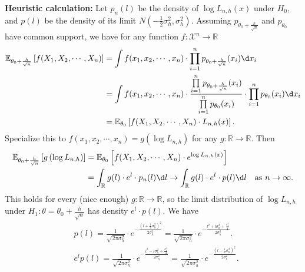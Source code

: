\documentclass[a4paper]{article}
\begin{document}
\begin{eg}
	\noindent \textbf{Heuristic calculation:} Let $p_n(l)$ be the density of $\log L_{n,h}(x)$ under $H_0$, and $p(l)$ be the density of its limit $N\left(- \frac{1}{2} \sigma_h^2, \sigma_h^2\right)$. Assuming $p_{\theta_0+\frac{h}{\sqrt{n}}}$ and $p_{\theta_0}$ have common support, we have for any function $f: \mathcal{X}^n \to \mathbb{R}$
	\begin{equation*}
		\begin{aligned}
			\mathbb{E}_{\theta_0+\frac{h}{\sqrt{n}}} \left[f(X_1,X_2,\cdots,X_n)\right] &= \int f(x_1,x_2,\cdots,x_n) \cdot \prod\limits_{i=1}^np_{\theta_0+\frac{h}{\sqrt{n}}} (x_i) \d x_i \\
			&= \int f(x_1,x_2,\cdots,x_n) \cdot \frac{\prod\limits_{i=1}^np_{\theta_0+\frac{h}{\sqrt{n}}} (x_i)}{\prod\limits_{i=1}^np_{\theta_0} (x_i)} \cdot \prod\limits_{i=1}^np_{\theta_0} (x_i) \d x_i \\
			&= \mathbb{E}_{\theta_0} \left[f(X_1,X_2,\cdots,X_n) \cdot L_{n,h}(x)\right].
		\end{aligned}
	\end{equation*}
	Specialize this to $f(x_1,x_2,\cdots,x_n) = g\left(\log L_{n,h}\right)$ for any $g: \mathbb{R} \to \mathbb{R}$. Then
	\begin{equation*}
		\begin{aligned}
			\mathbb{E}_{\theta_0+\frac{h}{\sqrt{n}}}\left[g\left(\log L_{n,h}\right)\right] &= \mathbb{E}_{\theta_0} \left[f(X_1,X_2,\cdots,X_n) \cdot e^{\log L_{n,h}(x)}\right] \\
			&= \int_{\mathbb{R}} g(l) \cdot e^l \cdot p_n(l) \d l \to \int_{\mathbb{R}} g(l) \cdot e^l \cdot p(l) \d l \quad \text{as $n \to \infty$.}
		\end{aligned}
	\end{equation*}
	This holds for every (nice enough) $g: \mathbb{R} \to \mathbb{R}$, so the limit distribution of $\log L_{n,h}$ under $H_1: \theta = \theta_0 + \frac{h}{\sqrt{n}}$ has density $e^l \cdot p(l)$. We have
	\begin{equation*}
		\begin{aligned}
			&p(l) = \frac{1}{\sqrt{2 \pi \sigma_h^2}} \cdot e^{-\frac{\left(l + \frac{1}{2} \sigma_h^2 \right)^2}{2\sigma_h^2}} = \frac{1}{\sqrt{2 \pi \sigma_h^2}} \cdot e^{-\frac{l^2 + l \sigma_h^2 + \frac{\sigma_h^4}{4}}{2\sigma_h^2}}. \\
			&e^lp(l) = \frac{1}{\sqrt{2 \pi \sigma_h^2}} \cdot e^{-\frac{l^2 - l \sigma_h^2 + \frac{\sigma_h^4}{4}}{2\sigma_h^2}} = \frac{1}{\sqrt{2 \pi \sigma_h^2}} \cdot e^{-\frac{\left(l - \frac{1}{2} \sigma_h^2 \right)^2}{2\sigma_h^2}}.

\end{aligned}
\end{equation*}
\end{eg}
\end{document}
